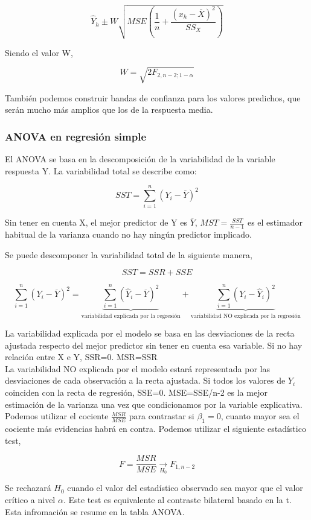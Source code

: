 $$
\hat Y_h \pm W\sqrt{MSE\left(\frac{1}{n}+\frac{(x_h-\overline{X})^2}{SS_X}\right)}
$$

Siendo el valor W,

$$
W=\sqrt{2F_{2,n-2;1-\alpha}}
$$

También podemos construir bandas de confianza para los valores predichos, que serán mucho más amplios que los de la respuesta media.

\subsubsection{ANOVA en regresión simple}

El ANOVA se basa en la descomposición de la variabilidad de la variable respuesta Y. La variabilidad total se describe como:

$$
SST=\sum_{i=1}^{n}(Y_i-\overline{Y})^2
$$

Sin tener en cuenta X, el mejor predictor de Y es $\overline{Y}$, $MST=\frac{SST}{n-1}$ es el estimador habitual de la varianza cuando no hay ningún predictor implicado.

Se puede descomponer la variabilidad total de la siguiente manera,

$$
SST=SSR+SSE
$$

$$
\sum_{i=1}^{n}(Y_i-\overline{Y})^2=\underbrace{\sum_{i=1}^{n}(\hat Y_i-\overline{Y})^2}_{\text{variabilidad explicada por la regresión}}+\underbrace{\sum_{i=1}^{n}(Y_i-\hat{Y}_i)^2}_\text{variabilidad NO explicada por la regresión}
$$

La variabilidad explicada por el modelo se basa en las desviaciones de la recta ajustada respecto del mejor predictor sin tener en cuenta esa variable. Si no hay relación entre X e Y, SSR=0. MSR=SSR\\

La variabilidad NO explicada por el modelo estará representada por las desviaciones de cada observación a la recta ajustada. Si todos los valores de $Y_i$ coinciden con la recta de regresión, SSE=0. MSE=SSE/n-2 es la mejor estimación de la varianza una vez que condicionamos por la variable explicativa.\\

Podemos utilizar el cociente $\frac{MSR}{MSE}$ para contrastar si $\beta_1=0$, cuanto mayor sea el cociente más evidencias habrá en contra. Podemos utilizar el siguiente estadístico test,

$$
F=\frac{MSR}{MSE}\underset{H_0}{\longrightarrow}F_{1,n-2}
$$

Se rechazará $H_0$ cuando el valor del estadístico observado sea mayor que el valor crítico a nivel $\alpha$. Este test es equivalente al contraste bilateral basado en la t. Esta infromación se resume en la tabla ANOVA.

